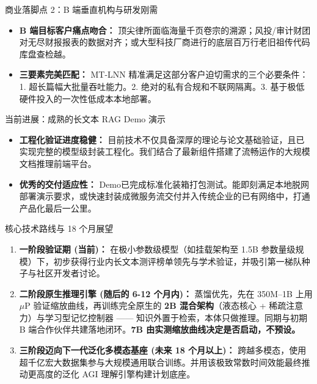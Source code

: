 ﻿\documentclass[aspectratio=169, 10pt]{beamer}
\begin{document}
\begin{frame}{商业落脚点 2：B 端垂直机构与研发刚需}
\begin{itemize}
    \item \textbf{B 端目标客户痛点吻合：} 
        顶尖律所面临海量千页卷宗的溯源；风投/审计财团对无尽财报报表的数据对齐；或大型科技厂商进行的底层百万行老旧祖传代码库盘查检越。
    \item \textbf{三要素完美匹配：} MT-LNN 精准满足这部分客户迫切需求的三个必要条件：1. 超长篇幅大批量吞吐能力。2. 绝对的私有合规和不联网隔离。3. 基于极低硬件投入的一次性低成本本地部署。
\end{itemize}
\end{frame}

\begin{frame}{当前进展：成熟的长文本 RAG Demo 演示}
\begin{itemize}
    \item \textbf{工程化验证进度稳健：} 目前技术不仅具备深厚的理论与论文基础验证，且已实现完整的模型级封装工程化。我们结合了最新组件搭建了流畅运作的大规模文档推理前端平台。
    \item \textbf{优秀的交付适应性：} Demo已完成标准化装箱打包测试。能即刻满足本地脱网部署演示要求，或快速封装成微服务流交付并入传统企业的已有网络中，打通产品化最后一公里。
\end{itemize}
\end{frame}

\begin{frame}{核心技术路线与 18 个月展望}
\begin{enumerate}
    \item \textbf{一阶段验证期 (当前)：} 在极小参数级模型（如挂载架构至 1.5B 参数量级规模）下，初步获得行业内长文本测评榜单领先与学术验证，并吸引第一梯队种子与社区开发者讨论。
    \vspace{0.5em}
    \item \textbf{二阶段原生推理引擎 (随后的 6-12 个月内)：} 蒸馏优先，先在 350M--1B 上用 $\mu$P 验证缩放曲线，再训练完全原生的 \textbf{2B 混合架构}（液态核心 + 稀疏注意力）与学习型记忆控制器 —— 知识外置于检索，本体只做推理。同期与初期 B 端合作伙伴共建落地闭环。\textbf{7B 由实测缩放曲线决定是否启动，不预设。}
    \vspace{0.5em}
    \item \textbf{三阶段迈向下一代泛化多模态基座 (未来 18 个月以上)：} 跨越多模态，使用超千亿宏大数据集参与大规模通用联合训练。并用该极致常数时间效能最终推动更高度的泛化 AGI 理解引擎构建计划底座。
\end{enumerate}
\end{frame}
\end{document}
